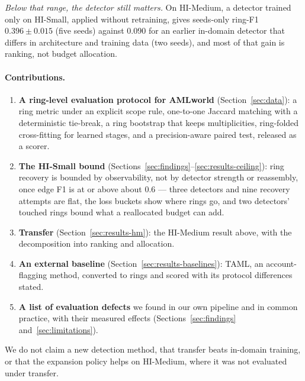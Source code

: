 \emph{Below that range, the detector still matters.} On HI-Medium, a detector trained only on
HI-Small, applied without retraining, gives seeds-only ring-F1 $0.396 \pm 0.015$ (five seeds)
against 0.090 for an earlier in-domain detector that differs in architecture and training data
(two seeds), and most of that gain is ranking, not budget allocation.

\paragraph{Contributions.}
\begin{enumerate}
\item \textbf{A ring-level evaluation protocol for AMLworld} (Section~\ref{sec:data}): a ring
  metric under an explicit scope rule, one-to-one Jaccard matching with a deterministic
  tie-break, a ring bootstrap that keeps multiplicities, ring-folded cross-fitting for learned
  stages, and a precision-aware paired test, released as a scorer.
\item \textbf{The HI-Small bound} (Sections~\ref{sec:findings}--\ref{sec:results-ceiling}): ring
  recovery is bounded by observability, not by detector strength or reassembly, once edge F1 is
  at or above about 0.6 --- three detectors and nine recovery attempts are flat, the loss buckets
  show where rings go, and two detectors' touched rings bound what a reallocated budget can add.
\item \textbf{Transfer} (Section~\ref{sec:results-hm}): the HI-Medium result above, with the
  decomposition into ranking and allocation.
\item \textbf{An external baseline} (Section~\ref{sec:results-baselines}): TAML, an
  account-flagging method, converted to rings and scored with its protocol differences stated.
\item \textbf{A list of evaluation defects} we found in our own pipeline and in common practice,
  with their measured effects (Sections~\ref{sec:findings} and~\ref{sec:limitations}).
\end{enumerate}

We do not claim a new detection method, that transfer beats in-domain training, or that the
expansion policy helps on HI-Medium, where it was not evaluated under transfer.
